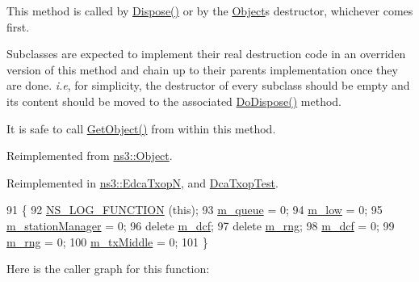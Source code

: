 This method is called by \hyperlink{classns3_1_1Object_aa90ae598863f6c251cdab3c3722afdaf}{Dispose()} or by the \hyperlink{classns3_1_1Object}{Object}\textquotesingle{}s destructor, whichever comes first.

Subclasses are expected to implement their real destruction code in an overriden version of this method and chain up to their parent\textquotesingle{}s implementation once they are done. {\itshape i.\+e}, for simplicity, the destructor of every subclass should be empty and its content should be moved to the associated \hyperlink{classns3_1_1DcaTxop_aec098be399c62ab23c509483429f96fb}{Do\+Dispose()} method.

It is safe to call \hyperlink{classns3_1_1Object_a13e18c00017096c8381eb651d5bd0783}{Get\+Object()} from within this method. 

Reimplemented from \hyperlink{classns3_1_1Object_a475d429a75d302d4775f4ae32479b287}{ns3\+::\+Object}.



Reimplemented in \hyperlink{classns3_1_1EdcaTxopN_a8d460247e058990e567c5d753fda2f01}{ns3\+::\+Edca\+TxopN}, and \hyperlink{classDcaTxopTest_ac1a6b709c6c36f5bdf5d1a5ca9e639e3}{Dca\+Txop\+Test}.


\begin{DoxyCode}
91 \{
92   \hyperlink{log-macros-disabled_8h_a90b90d5bad1f39cb1b64923ea94c0761}{NS\_LOG\_FUNCTION} (\textcolor{keyword}{this});
93   \hyperlink{classns3_1_1DcaTxop_a7f42500857237f6f18aee436ef22ef62}{m\_queue} = 0;
94   \hyperlink{classns3_1_1DcaTxop_a76de11e512290acc37c9863f7ab17758}{m\_low} = 0;
95   \hyperlink{classns3_1_1DcaTxop_af78d36622900e857d31315038946d8f6}{m\_stationManager} = 0;
96   \textcolor{keyword}{delete} \hyperlink{classns3_1_1DcaTxop_a16cc1f168ff78aabcf938e42996121c4}{m\_dcf};
97   \textcolor{keyword}{delete} \hyperlink{classns3_1_1DcaTxop_a9044b173b448e6c40b730740621cb238}{m\_rng};
98   \hyperlink{classns3_1_1DcaTxop_a16cc1f168ff78aabcf938e42996121c4}{m\_dcf} = 0;
99   \hyperlink{classns3_1_1DcaTxop_a9044b173b448e6c40b730740621cb238}{m\_rng} = 0;
100   \hyperlink{classns3_1_1DcaTxop_a605ac1de505d652e229d14a9e75c7b1a}{m\_txMiddle} = 0;
101 \}
\end{DoxyCode}


Here is the caller graph for this function\+:


